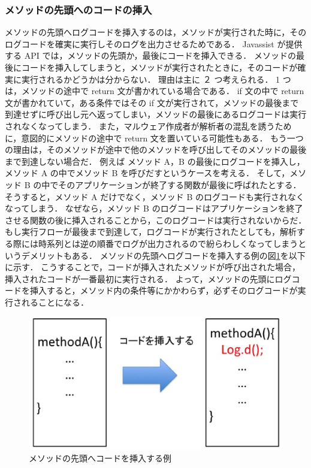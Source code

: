 \subsubsection{メソッドの先頭へのコードの挿入}
 \label{methodtop}
メソッドの先頭へログコードを挿入するのは，メソッドが実行された時に，そのログコードを確実に実行しそのログを出力させるためである．
Javassist が提供する API では，メソッドの先頭か，最後にコードを挿入できる．
メソッドの最後にコードを挿入してしまうと，メソッドが実行されたときに，そのコードが確実に実行されるかどうかは分からない．
理由は主に ２ つ考えられる．
1 つは，メソッドの途中で return 文が書かれている場合である．
if 文の中で return 文が書かれていて，ある条件ではその if 文が実行されて，メソッドの最後まで到達せずに呼び出し元へ返ってしまい，メソッドの最後にあるログコードは実行されなくなってしまう．
また，マルウェア作成者が解析者の混乱を誘うために，意図的にメソッドの途中で return 文を置いている可能性もある．
もう一つの理由は，そのメソッドが途中で他のメソッドを呼び出してそのメソッドの最後まで到達しない場合だ．
例えば メソッド A，B の最後にログコードを挿入し，メソッド A の中でメソッド B を呼びだすというケースを考える．
そして，メソッド B の中でそのアプリケーションが終了する関数が最後に呼ばれたとする．
そうすると，メソッド A だけでなく，メソッド B のログコードも実行されなくなってしまう．
なぜなら，メソッド B のログコードはアプリケーションを終了させる関数の後に挿入されることから，このログコードは実行されないからだ．
もし実行フローが最後まで到達して，ログコードが実行されたとしても，解析する際には時系列とは逆の順番でログが出力されるので紛らわしくなってしまうというデメリットもある．
メソッドの先頭へログコードを挿入する例の図\ref{insertbeforeexp}を以下に示す．
こうすることで，コードが挿入されたメソッドが呼び出された場合，挿入されたコードが一番最初に実行される．
よって，メソッドの先頭にログコードを挿入すると，メソッド内の条件等にかかわらず，必ずそのログコードが実行されることになる．

\begin{figure}[t]
\begin{center}
\graphicspath{{./epsfiles/}}
\includegraphics[scale=0.3]{image2.eps}
\end{center}
\caption{メソッドの先頭へコードを挿入する例}
\label{insertbeforeexp}
\end{figure}

